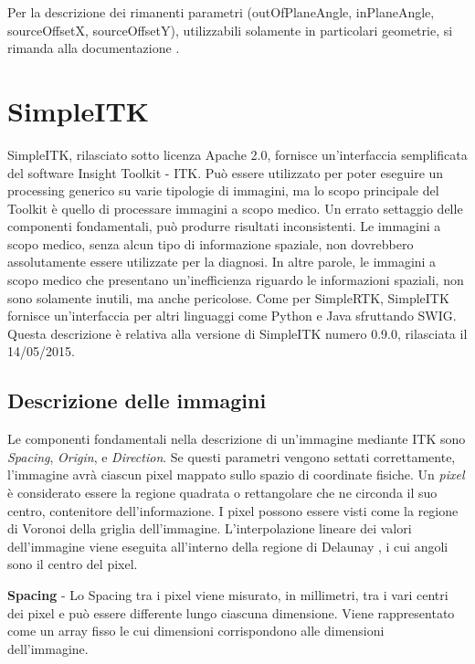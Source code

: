 \documentclass[a4paper,12pt, doubleside]{report}
\begin{document}
                    Per la descrizione dei rimanenti parametri (outOfPlaneAngle, inPlaneAngle, sourceOffsetX, sourceOffsetY), utilizzabili solamente in particolari geometrie, si rimanda alla documentazione \cite{rtk-geometry}.
                
        \section{SimpleITK}
            \par
                SimpleITK, rilasciato sotto licenza Apache 2.0, fornisce un'interfaccia semplificata del software Insight Toolkit - ITK. Può essere utilizzato per poter eseguire un processing generico su varie tipologie di immagini, ma lo scopo principale del Toolkit è quello di processare immagini a scopo medico. Un errato settaggio delle componenti fondamentali, può produrre risultati inconsistenti. Le immagini a scopo medico, senza alcun tipo di informazione spaziale, non dovrebbero assolutamente essere utilizzate per la diagnosi. In altre parole, le immagini a scopo medico che presentano un'inefficienza riguardo le informazioni spaziali, non sono solamente inutili, ma anche pericolose. Come per SimpleRTK, SimpleITK fornisce un'interfaccia per altri linguaggi come Python e Java sfruttando SWIG. Questa descrizione è relativa alla versione di SimpleITK numero 0.9.0, rilasciata il 14/05/2015.
                
            \subsection{Descrizione delle immagini}
                Le componenti fondamentali nella descrizione di un'immagine mediante ITK sono \textit{Spacing}, \textit{Origin}, e \textit{Direction}. Se questi parametri vengono settati correttamente, l'immagine avrà ciascun pixel mappato sullo spazio di coordinate fisiche. Un \textit{pixel} è considerato essere la regione quadrata o rettangolare che ne circonda il suo centro, contenitore dell'informazione. I pixel possono essere visti come la regione di Voronoi \cite{voronoi} della griglia dell’immagine. L’interpolazione lineare dei valori dell’immagine viene eseguita all’interno della regione di Delaunay \cite{delaunay}, i cui angoli sono il centro del pixel.
                
                \bigskip
                \textbf{Spacing} - Lo Spacing tra i pixel viene misurato, in millimetri, tra i vari centri dei pixel e può essere differente lungo ciascuna dimensione. Viene rappresentato come un array fisso le cui dimensioni corrispondono alle dimensioni dell'immagine.
                
\end{document}

